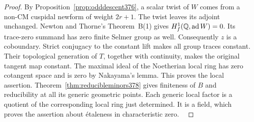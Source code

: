 \documentclass[a4paper,11pt]{article}
\theoremstyle{definition}
\theoremstyle{remark}
\numberwithin{equation}{section}
\begin{document}
\begin{proof}
By Proposition~\ref{prop:odddescent376}, a scalar twist of
\(W\) comes from a non-CM cuspidal newform of weight \(2r+1\).
The twist leaves its adjoint unchanged. Newton and Thorne's
Theorem~B(1) gives \(H_f^1(\mathbb Q,\operatorname{ad}W)=0\).
Its trace-zero summand has zero finite Selmer group as well.
Consequently \(z\) is a coboundary. Strict conjugacy to
the constant lift makes all group traces constant. Their
topological generation of \(T\), together with continuity,
makes the original tangent map constant. The maximal ideal
of the Noetherian local ring has zero cotangent space and
is zero by Nakayama's lemma. This proves the local assertion.
Theorem~\ref{thm:reducibleminors378} gives finiteness of
\(B\) and reducibility at all its generic geometric points.
Each generic local factor is a quotient of the corresponding
local ring just determined. It is a field, which proves
the assertion about \'etaleness in characteristic zero.
~\cite{VIII-VI-VI-nt119}
\end{proof}
\end{document}
